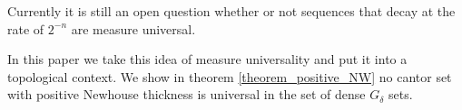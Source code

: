 Currently it is still an open question whether or not sequences that decay at the rate of $2^{-n}$ are measure universal. 


In this paper we take this idea of measure universality and put it into a topological context.  We show in theorem \ref{theorem_positive_NW} no cantor set with positive Newhouse thickness is universal in the set of dense $G_\delta$ sets.



